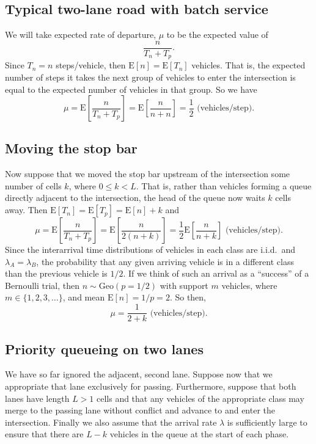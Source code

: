 \documentclass{amsart}
\begin{document}
\subsection{Typical two-lane road with batch service}
We will take expected rate of departure, $\mu$ to be the expected value of
\begin{equation*}
  \frac{n}{T_n+T_p}.
\end{equation*}
Since $T_n=n$ steps/vehicle, then $\text{E}[n]=\text{E}[T_n]$ vehicles.
That is, the expected number of steps it takes the next group of vehicles to
enter the intersection is equal to the expected number of vehicles in that
group. So we have
\begin{equation}
  \mu = \text{E}\left[\frac{n}{T_n+T_p}\right]
  =\text{E}\left[\frac{n}{n+n}\right] = \frac{1}{2}\text{ (vehicles/step)}.
\end{equation}

\subsection{Moving the stop bar}
Now suppose that we moved the stop bar upstream of the intersection some number
of cells $k$, where $0\leq k<L$.
That is, rather than vehicles forming a queue directly adjacent to the
intersection, the head of the queue now waits $k$ cells away.
Then $\text{E}[T_n]=\text{E}[T_p]=\text{E}[n]+k$ and
\begin{equation*}
  \mu = \text{E}\left[\frac{n}{T_n+T_p}\right]
  = \text{E}\left[\frac{n}{2(n+k)}\right]
  = \frac{1}{2}\text{E}\left[\frac{n}{n+k}\right]\text{ (vehicles/step)}.
\end{equation*}
Since the interarrival time distributions of vehicles in each class are i.i.d.\ and
$\lambda_A=\lambda_B$, the probability that any given arriving vehicle is in a
different class than the previous vehicle is $1/2$.
If we think of such an arrival as a ``success'' of a Bernoulli trial,
then $n\sim \text{Geo}(p=1/2)$ with support $m$ vehicles, where
$m\in\{1,2,3,\dots\}$, and mean $\text{E}[n]=1/p=2$.
So then,
\begin{equation}
  \mu=\frac{1}{2+k}\text{ (vehicles/step)}.
\end{equation}

\subsection{Priority queueing on two lanes}
We have so far ignored the adjacent, second lane. Suppose now that we appropriate that
lane exclusively for passing.
Furthermore, suppose that both lanes have length $L>1$ cells and that any
vehicles of the appropriate class may merge to the passing lane without conflict
and advance to and enter the intersection.
Finally we also assume that the arrival rate $\lambda$ is sufficiently large to
ensure that there are $L-k$ vehicles in the queue at the start of each phase.
\end{document}
